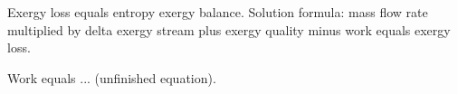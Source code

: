 Exergy loss equals entropy exergy balance.  
Solution formula: mass flow rate multiplied by delta exergy stream plus exergy quality minus work equals exergy loss.  

Work equals ... (unfinished equation).